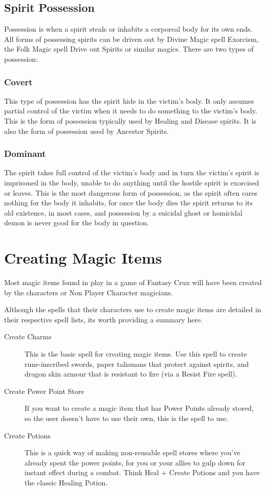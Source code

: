 \subsection{Spirit Possession}
Possession is when a spirit steals or inhabits a corporeal body for its own ends. All forms of possessing spirits can be driven out by Divine Magic spell Exorcism, the Folk Magic spell Drive out Spirits or similar magics. There are two types of possession:

\subsubsection{Covert}
This type of possession has the spirit hide in the victim’s body. It only assumes partial control of the victim when it needs to do something to the victim’s body. This is the form of possession typically used by Healing and Disease spirits. It is also the form of possession used by Ancestor Spirits.

\subsubsection{Dominant}
The spirit takes full control of the victim’s body and in turn the victim’s spirit is imprisoned in the body, unable to do anything until the hostile spirit is exorcised or leaves. This is the most dangerous form of possession, as the spirit often cares nothing for the body it inhabits, for once the body dies the spirit returns to its old existence, in most cases, and possession by a suicidal ghost or homicidal demon is never good for the body in question.




\section{Creating Magic Items}

Most magic items found in play in a game of Fantasy Crux will have been created by the characters or Non Player Character magicians.

Although the spells that their characters use to create magic items are detailed in their respective spell lists, its worth providing a summary here.

\begin{description}
\item [Create Charms] This is the basic spell for creating magic items. Use this spell to create rune-inscribed swords, paper talismans that protect against spirits, and dragon skin armour that is resistant to fire (via a Resist Fire spell).
\item [Create Power Point Store] If you want to create a magic item that has Power Points already stored, so the user doesn’t have to use their own, this is the spell to use.
\item [Create Potions] This is a quick way of making non-reusable spell stores where you’ve already spent the power points, for you or your allies to gulp down for instant effect during a combat. Think Heal + Create Potions and you have the classic Healing Potion.
\end{description}

